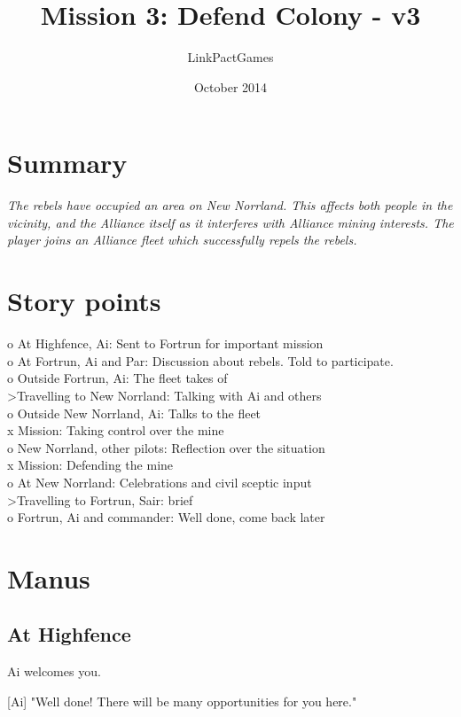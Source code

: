 \documentclass[a4paper,12pt]{article}
\begin{document}
\title{Mission 3: Defend Colony - v3}
\author{LinkPactGames}
\date{October 2014}
\maketitle

\section{Summary}
\textit{The rebels have occupied an area on New Norrland. This affects both people in
the vicinity, and the Alliance itself as it interferes with Alliance
mining interests. The player joins an Alliance fleet which successfully
repels the rebels.}

\section{Story points}

o At Highfence, Ai: Sent to Fortrun for important mission\\
o At Fortrun, Ai and Par: Discussion about rebels. Told to participate.\\
o Outside Fortrun, Ai: The fleet takes of\\
\textgreater Travelling to New Norrland: Talking with Ai and others\\
o Outside New Norrland, Ai: Talks to the fleet\\
x Mission: Taking control over the mine\\
o New Norrland, other pilots: Reflection over the situation\\
x Mission: Defending the mine\\
o At New Norrland: Celebrations and civil sceptic input\\
\textgreater Travelling to Fortrun, Sair: brief\\
o Fortrun, Ai and commander: Well done, come back later

\section{Manus}

\subsection{At Highfence}

Ai welcomes you.

[Ai] "Well done! There will be many opportunities for you here."
\end{document}

